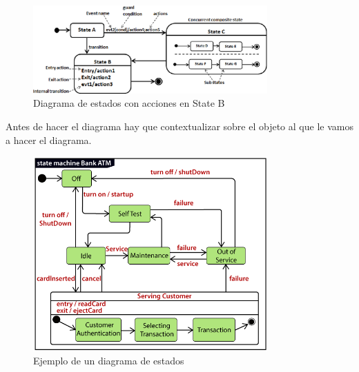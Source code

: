 \documentclass[titlepage,a4paper]{article}
\begin{document}
\begin{figure}[!htb]
    \centering
    \includegraphics[width=0.8\textwidth]{Imagenes/StateDiagramWithActions.png}
    \caption{Diagrama de estados con acciones en State B}
\end{figure}

Antes de hacer el diagrama hay que contextualizar sobre el objeto al que le vamos a hacer el diagrama.

\begin{figure}[!htb]
    \centering
    \includegraphics[width=0.8\textwidth]{Imagenes/StateDiagramExample.png}
    \caption{Ejemplo de un diagrama de estados}
\end{figure}

% 
\end{document}
